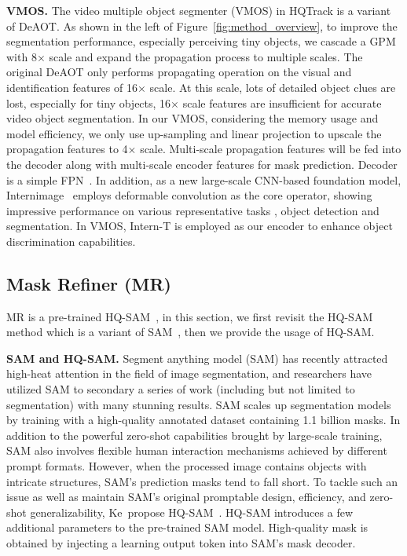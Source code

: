 \documentclass[10pt,twocolumn,letterpaper]{article}
\begin{document}
\noindent\textbf{VMOS.}
The video multiple object segmenter (VMOS) in HQTrack is a variant of DeAOT.
As shown in the left of Figure~\ref{fig:method_overview}, to improve the segmentation performance, especially perceiving tiny objects,
we cascade a GPM with 8$\times$ scale and expand the propagation process to multiple scales.
The original DeAOT only performs propagating operation on the visual and identification features of 16$\times$ scale. 
At this scale, lots of detailed object clues are lost, especially for tiny objects, 16$\times$ scale features are insufficient for accurate video object segmentation.
In our VMOS, considering the memory usage and model efficiency, we only use up-sampling and linear projection to upscale the propagation features to 4$\times$ scale.
Multi-scale propagation features will be fed into the decoder along with multi-scale encoder features for mask prediction.
Decoder is a simple FPN~\cite{fpn}.
In addition, as a new large-scale CNN-based foundation model, Internimage~\cite{internimage} 
employs deformable convolution as the core operator, showing impressive performance on various representative tasks \eg, object detection and segmentation.
In VMOS, Intern-T is employed as our encoder to enhance object discrimination capabilities. 

\subsection{Mask Refiner (MR)}
\label{sec:mr}

MR is a pre-trained HQ-SAM~\cite{sam_hq}, in this section, we first revisit the HQ-SAM method which is a variant of SAM~\cite{sam}, then we provide the usage of HQ-SAM.

\noindent\textbf{SAM and HQ-SAM.}
Segment anything model (SAM) has recently attracted high-heat attention in the field of image segmentation, and researchers have utilized SAM to secondary a series of work (including but not limited to segmentation) with many stunning results.
SAM scales up segmentation models by training with a high-quality annotated dataset containing 1.1 billion masks.
In addition to the powerful zero-shot capabilities brought  by large-scale training, SAM also involves flexible human interaction mechanisms achieved by different prompt formats.  
However, when the processed image contains  objects with intricate structures, SAM's prediction masks tend to fall short.
To tackle such an issue as well as maintain  SAM's original promptable design, efficiency, and zero-shot generalizability, Ke~\etal propose HQ-SAM~\cite{sam_hq}.  HQ-SAM introduces a few additional parameters to the pre-trained SAM model. High-quality mask is obtained by injecting a learning output token into SAM's mask decoder.
\end{document}
